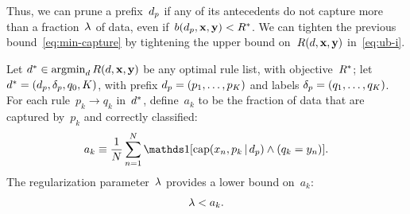 Thus, we can prune a prefix~$d_p$ if any of its antecedents do not capture
more than a fraction~${\lambda}$ of data, even if~${b(d_p, \mathbf{x}, \mathbf{y}) < R^*}$.
%
We can tighten the previous bound~\eqref{eq:min-capture}
by tightening the upper bound on~$R({d}, \mathbf{x}, \mathbf{y})$ in~\eqref{eq:ub-i}.

\begin{theorem}
\label{thm:min-capture-correct}
Let ${d^* \in \operatorname*{argmin}_{d} R({d}, \mathbf{x}, \mathbf{y})}$
be any optimal rule list, with objective~$R^*$;
let ${d^* = (d_p, \delta_p, q_0, K)}$,
with prefix ${d_p = (p_1, \dots, p_K)}$
and labels ${\delta_p = (q_1, \dots, q_K)}$.
%
For each rule~${p_k \rightarrow q_k}$ in~$d^*$,
define~$a_k$ to be the fraction of data that are captured by~$p_k$
and correctly classified:
\begin{align}
a_k \equiv \frac{1}{N} \sum_{n=1}^N
  \one [ \Cap(x_n, p_k \given \Prefix) \wedge (q_k = y_n) ].
\label{eq:rule-correct}
\end{align}
The regularization parameter~${\lambda}$ provides a lower bound on~$a_k$:
\begin{align}
\Reg < a_k.
\label{eq:min-capture-correct}
\end{align}
\end{theorem}

